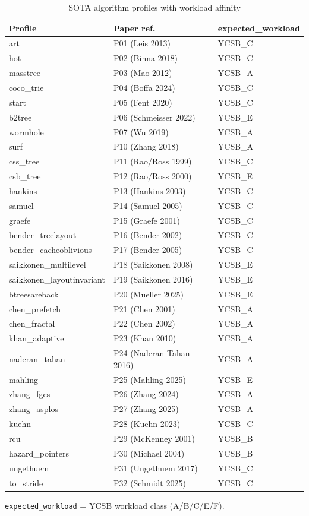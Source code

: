 \begin{table}[!htbp]
  \caption{SOTA algorithm profiles with workload affinity}\label{tab:sota-profiles}
  \centering\small
  \begin{tabular}{lll}
    \toprule
    \textbf{Profile} & \textbf{Paper ref.} & \textbf{expected\_workload} \\
    \midrule
    art & P01 (Leis 2013) & YCSB\_C \\
    hot & P02 (Binna 2018) & YCSB\_C \\
    masstree & P03 (Mao 2012) & YCSB\_A \\
    coco\_trie & P04 (Boffa 2024) & YCSB\_C \\
    start & P05 (Fent 2020) & YCSB\_C \\
    b2tree & P06 (Schmeisser 2022) & YCSB\_E \\
    wormhole & P07 (Wu 2019) & YCSB\_A \\
    surf & P10 (Zhang 2018) & YCSB\_A \\
    css\_tree & P11 (Rao/Ross 1999) & YCSB\_C \\
    csb\_tree & P12 (Rao/Ross 2000) & YCSB\_E \\
    hankins & P13 (Hankins 2003) & YCSB\_C \\
    samuel & P14 (Samuel 2005) & YCSB\_C \\
    graefe & P15 (Graefe 2001) & YCSB\_C \\
    bender\_treelayout & P16 (Bender 2002) & YCSB\_C \\
    bender\_cacheoblivious & P17 (Bender 2005) & YCSB\_C \\
    saikkonen\_multilevel & P18 (Saikkonen 2008) & YCSB\_E \\
    saikkonen\_layoutinvariant & P19 (Saikkonen 2016) & YCSB\_E \\
    btreesareback & P20 (Mueller 2025) & YCSB\_E \\
    chen\_prefetch & P21 (Chen 2001) & YCSB\_A \\
    chen\_fractal & P22 (Chen 2002) & YCSB\_A \\
    khan\_adaptive & P23 (Khan 2010) & YCSB\_A \\
    naderan\_tahan & P24 (Naderan-Tahan 2016) & YCSB\_A \\
    mahling & P25 (Mahling 2025) & YCSB\_E \\
    zhang\_fgcs & P26 (Zhang 2024) & YCSB\_A \\
    zhang\_asplos & P27 (Zhang 2025) & YCSB\_A \\
    kuehn & P28 (Kuehn 2023) & YCSB\_C \\
    rcu & P29 (McKenney 2001) & YCSB\_B \\
    hazard\_pointers & P30 (Michael 2004) & YCSB\_B \\
    ungethuem & P31 (Ungethuem 2017) & YCSB\_C \\
    to\_stride & P32 (Schmidt 2025) & YCSB\_C \\
    \bottomrule
  \end{tabular}

  \smallskip
  {\footnotesize \texttt{expected\_workload} = YCSB workload class (A/B/C/E/F).\par}
\end{table}

